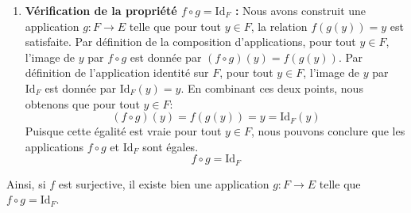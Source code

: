 \documentclass[12pt,a4paper]{report}
\begin{document}
\begin{enumerate}
  \begin{itemize}
  \item
    \textbf{Si \(F\) est un ensemble fini :} Supposons que
    \(F = \{y_1, y_2, \dots, y_n\}\). Pour chaque \(y_i \in F\),
    l'ensemble \(f^{-1}(\{y_i\})\) est non vide. Nous pouvons alors
    choisir un élément \(x_i \in E\) tel que \(f(x_i) = y_i\). Nous
    définissons ensuite l'application \(g: F \to E\) en posant
    \(g(y_i) = x_i\) pour chaque \(i \in \{1, \dots, n\}\).
  \item
    \textbf{Si \(F\) est un ensemble infini :} Dans ce cas, nous avons
    une famille potentiellement infinie d'ensembles non vides
    \((f^{-1}(\{y\}))_{y \in F}\). Pour pouvoir effectuer un choix
    simultané d'un élément dans chacun de ces ensembles, nous faisons
    appel à l'\textbf{Axiome du Choix}. L'Axiome du Choix stipule que
    pour toute famille non vide d'ensembles non vides
    \((A_i)_{i \in I}\), il existe une fonction de choix
    \(c: I \to \bigcup_{i \in I} A_i\) telle que \(c(i) \in A_i\) pour
    tout \(i \in I\). Dans notre contexte, l'ensemble d'indices est
    \(I = F\), et pour chaque \(y \in F\), l'ensemble correspondant est
    \(A_y = f^{-1}(\{y\})\). L'Axiome du Choix garantit donc l'existence
    d'une fonction \(g: F \to E\) telle que pour tout \(y \in F\),
    \(g(y) \in f^{-1}(\{y\})\). Par définition de l'ensemble
    \(f^{-1}(\{y\})\), la condition \(g(y) \in f^{-1}(\{y\})\) signifie
    précisément que \(f(g(y)) = y\) pour tout \(y \in F\).
  \end{itemize}
\item
  \textbf{Vérification de la propriété \(f \circ g = \text{Id}_F\) :}
  Nous avons construit une application \(g: F \to E\) telle que pour
  tout \(y \in F\), la relation \(f(g(y)) = y\) est satisfaite. Par
  définition de la composition d'applications, pour tout \(y \in F\),
  l'image de \(y\) par \(f \circ g\) est donnée par
  \((f \circ g)(y) = f(g(y))\). Par définition de l'application identité
  sur \(F\), pour tout \(y \in F\), l'image de \(y\) par \(\text{Id}_F\)
  est donnée par \(\text{Id}_F(y) = y\). En combinant ces deux points,
  nous obtenons que pour tout \(y \in F\): \[
  (f \circ g)(y) = f(g(y)) = y = \text{Id}_F(y)
  \] Puisque cette égalité est vraie pour tout \(y \in F\), nous pouvons
  conclure que les applications \(f \circ g\) et \(\text{Id}_F\) sont
  égales. \[
  f \circ g = \text{Id}_F
  \]
\end{enumerate}

Ainsi, si \(f\) est surjective, il existe bien une application
\(g: F \to E\) telle que \(f \circ g = \text{Id}_F\).
\end{document}
